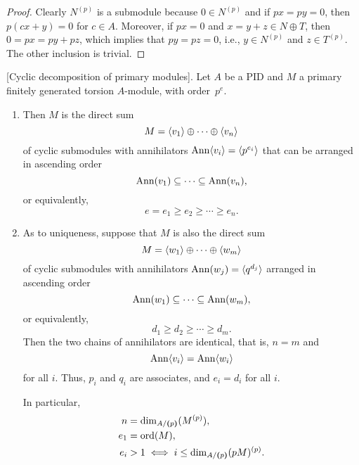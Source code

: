 \begin{proof}
    Clearly $N^{(p)}$ is a submodule because $0\in N^{(p)}$ and if $px=py=0$, then $p(cx+y)=0$ for $c\in A$. Moreover, if $px=0$ and $x=y+z\in N\oplus T$, then $0=px=py+pz$, which implies that $py=pz=0$, i.e., $y\in N^{(p)}$ and $z\in T^{(p)}$. The other inclusion is trivial.
\end{proof}

\begin{thm}\label{thm:cyclic-decomposition-of-primary}
    {\rm[Cyclic decomposition of primary modules]}.
    Let\/ $A$ be a PID and\/ $M$ a primary finitely generated torsion $A$-module, with order\/~$p^e$.
    \begin{enumerate}[\rm a)]
        \item Then\/ $M$ is the direct sum
        $$
            M = \langle v_1\rangle \oplus \cdots \oplus \langle v_n\rangle
        $$
        of cyclic submodules with annihilators $\operatorname{\operatorname{Ann}}\langle v_i\rangle=\langle p^{e_i}\rangle$ that can be arranged in ascending order
        $$
            \operatorname{\operatorname{Ann}}(v_1) \subseteq \cdots \subseteq \operatorname{\operatorname{Ann}}(v_n),
        $$
        or equivalently,
        $$
            e=e_1 \ge e_2 \ge \cdots \ge e_n.
        $$
        
        \item As to uniqueness, suppose that\/ $M$ is also the direct sum
        $$
            M = \langle w_1\rangle \oplus \cdots \oplus \langle w_m\rangle
        $$
        of cyclic submodules with annihilators $\operatorname{\operatorname{Ann}}(w_j)=\langle q^{d_j}\rangle$ arranged in ascending order
        $$
            \operatorname{\operatorname{Ann}}(w_1) \subseteq \cdots \subseteq \operatorname{\operatorname{Ann}}(w_m),
        $$
        or equivalently,
        $$
            d_1 \ge d_2 \ge \cdots \ge d_m.
        $$
        Then the two chains of annihilators are identical, that is, $n=m$ and
        $$
            \operatorname{\operatorname{Ann}}\langle v_i\rangle = \operatorname{\operatorname{Ann}}\langle w_i\rangle
        $$
        for all\/ $i$. Thus,\/ $p_i$ and\/ $q_i$ are associates, and\/ $e_i = d_i$ for all\/ $i$.

        In particular,
        \begin{align*}
            n &= \dim_{A/\textrm{\boldmath$($}p\textrm{\boldmath$)$}}(M^{(p)}),\\
            e_1 &=\operatorname{ord}(M),\\
            e_i &>1\iff
                i\le\dim_{A/\textrm{\boldmath$($}p\textrm{\boldmath$)$}}(pM)^{(p)}.
        \end{align*}
    \end{enumerate}
\end{thm}

